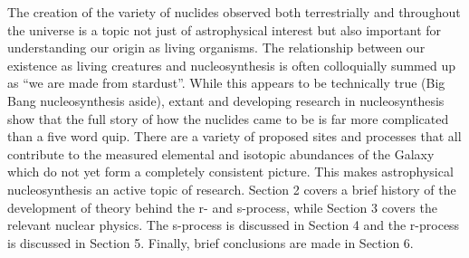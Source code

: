 The creation of the variety of nuclides observed both terrestrially and throughout the universe is a topic not just of astrophysical interest but also important for understanding our origin as living organisms.  The relationship between our existence as living creatures and nucleosynthesis is often colloquially summed up as ``we are made from stardust''.  While this appears to be technically true (Big Bang nucleosynthesis aside), extant and developing research in nucleosynthesis show that the full story of how the nuclides came to be is far more complicated than a five word quip.  There are a variety of proposed sites and processes that all contribute to the measured elemental and isotopic abundances of the Galaxy which do not yet form a completely consistent picture.  This makes astrophysical nucleosynthesis  an active topic of research.  Section 2 covers a brief history of the development of theory behind the r- and s-process, while Section 3 covers the relevant nuclear physics.  The s-process is discussed in Section 4 and the r-process is discussed in Section 5.  Finally, brief conclusions are made in Section 6.